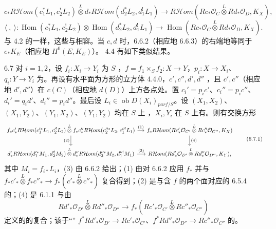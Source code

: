 \[c_*R\mathcal Hom(c_1^*L_1,c_2^!L_2)\mathbin{\overset L\otimes}d_*R\mathcal Hom(d_2^*L_2,d_1^!L_1)\longrightarrow R\mathcal Hom(Rc_*\mathcal O_C\mathbin{\overset L\otimes}Rd_*\mathcal O_D,K_X),\tag{6.6.2}\]
\[\langle\ ,\ \rangle:\operatorname{Hom}(c_1^*L_1,c_2^!L_2)\otimes\operatorname{Hom}(d_2^*L_2,d_1^!L_1)\longrightarrow\operatorname{Hom}(Rc_*\mathcal O_C\mathbin{\overset L\otimes}Rd_*\mathcal O_D,K_X).\tag{6.6.3}\]
与 4.2 的一样，这些与相容。当 $c,d$ 时，6.6.2（相应地 6.6.3）的右端地等同于 $e_*K_E$（相应地 $H^0(E,K_E)$）。
 4.4 有如下类似结果。
\begin{SGAresult}{}{6.7}
对 $i=1,2$，设 $f_i:X_i\to Y_i$ 为 $S$ ，$f=f_1\times_Sf_2:X\to Y$，$p_i:X\to X_i$、$q_i:Y\to Y_i$ 为。再设有水平面为方形的立方体 4.4.0，$c',c'',d',d''$ ，且 $c',c''$（相应地 $d',d''$）在 $c(C)$（相应地 $d(D)$）上方各点处。置 $c_i'=p_ic'$、$c_i''=p_ic''$、$d_i'=q_id'$、$d_i''=p_id''$。最后设 $L_i\in\operatorname{ob}D(X_i)_{parf/S}$。设 $(X_1,X_2)$、$(X_1,Y_2)$、$(Y_1,X_2)$、$(Y_1,Y_2)$ 均在 $S$ 上 ，$X_i,Y_i$ 在 $S$ 上有。则有交换方形
\[\begin{tikzcd}[column sep=small]
f_*c'_*R\mathcal Hom(c_1'^*L_1,c_2'^!L_2)\mathbin{\overset L\otimes}f_*c''_*R\mathcal Hom(c_2''^*L_2,c_1''^!L_1)\arrow[r,"(1)"]\arrow[d,"(2)"']&f_*R\mathcal Hom(Rc'_*\mathcal O_{C'}\mathbin{\overset L\otimes}Rc''_*\mathcal O_{C''},K_X)\arrow[d,"(4)"]\\d'_*R\mathcal Hom(d_1'^*M_1,d_2'^!M_2)\mathbin{\overset L\otimes}d''_*R\mathcal Hom(d_2''^*M_2,d_1''^!M_1)\arrow[r,"(3)"]&R\mathcal Hom(Rd'_*\mathcal O_{D'}\mathbin{\overset L\otimes}Rd''_*\mathcal O_{D''},K_Y),
\end{tikzcd}\tag{6.7.1}\]
其中 $M_i=f_{i*}L_i$，(3) 由 6.6.2 给出；(1) 由对 6.6.2 应用 $f_*$ 并与 $f_*c'_*\mathbin{\overset L\otimes}f_*c''_*\to f_*(c'_*\mathbin{\overset L\otimes}c''_*)$ 复合得到；(2) 是与含 $f$ 的两个面对应的 6.5.4 的；(4) 是 6.1.1 与由
\[Rd'_*\mathcal O_{D'}\mathbin{\overset L\otimes}Rd''_*\mathcal O_{D''}\longrightarrow f_*(Rc'_*\mathcal O_{C'}\mathbin{\overset L\otimes}Rc''_*\mathcal O_{C''})\]
定义的的复合；该于“” $f^*Rd'_*\mathcal O_{D'}\to Rc'_*\mathcal O_{C'}$、$f^*Rd''_*\mathcal O_{D''}\to Rc''_*\mathcal O_{C''}$ 的。
\end{SGAresult}
